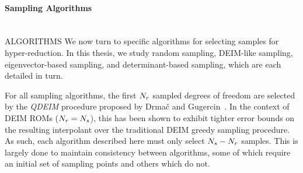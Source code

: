 \paragraph*{Sampling Algorithms}\mbox{}\\
%
{\color{red} ALGORITHMS}
We now turn to specific algorithms for selecting samples for hyper-reduction. In this thesis, we study random sampling, DEIM-like sampling, eigenvector-based sampling, and determinant-based sampling, which are each detailed in turn.

For all sampling algorithms, the first $N_r$ sampled degrees of freedom are selected by the \textit{QDEIM} procedure proposed by Drma\v{c} and Gugercin~\cite{Drmac2016}. In the context of DEIM ROMs ($N_r = N_s$), this has been shown to exhibit tighter error bounds on the resulting interpolant over the traditional DEIM greedy sampling procedure. As such, each algorithm described here must only select $N_s - N_r$ samples. This is largely done to maintain consistency between algorithms, some of which require an initial set of sampling points and others which do not.

